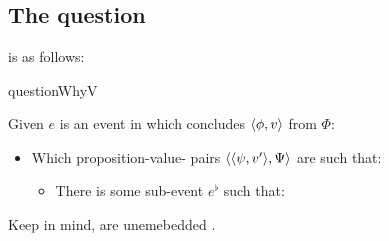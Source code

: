\section{\qWhyV{}}
\label{cha:var:qwhyvnp}




\subsection{The question}
\label{cha:var:qwhyvnp:question}

\begin{note}
  \qWhyV{} is as follows:

  \begin{question}{questionWhyV}{\qWhyV{}}
    \medskip

    Given \(e\) is an event in which \vAgent{} concludes \(\langle \phi, v \rangle\) from \(\Phi\):

    \begin{itemize}
    \item
      Which proposition-value-\pool{} pairs \(\langle \langle \psi, v' \rangle, \Psi \rangle\) are such that:
      \begin{itemize}
      \item
        There is some sub-event \(e^{\flat}\) such that:
      \end{itemize}
    \end{itemize}
    \vspace{-1.5\baselineskip}
  \end{question}
  {\color{red} Keep in mind, \ros{} are unemebedded .}
\end{note}

